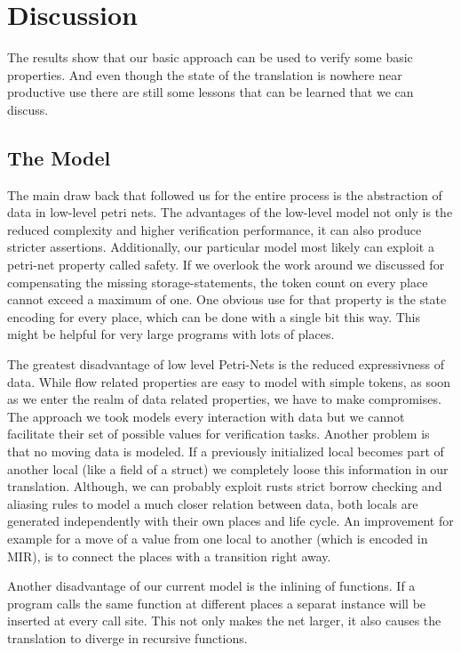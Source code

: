 \section{Discussion}
The results show that our basic approach can be used to verify some basic properties.
And even though the state of the translation is nowhere near productive use there are still some lessons that can be learned that we can discuss.
\subsection{The Model}
The main draw back that followed us for the entire process is the abstraction of data in low-level petri nets.
The advantages of the low-level model not only is the reduced complexity and higher verification performance, it can also produce stricter assertions.
Additionally, our particular model most likely can exploit a petri-net property called safety.
If we overlook the work around we discussed for compensating the missing storage-statements, the token count on every place cannot exceed a maximum of one.
One obvious use for that property is the state encoding for every place, which can be done with a single bit this way.
This might be helpful for very large programs with lots of places.

The greatest disadvantage of low level Petri-Nets is the reduced expressivness of data.
While flow related properties are easy to model with simple tokens, as soon as we enter the realm of data related properties, we have to make compromises.
The approach we took models every interaction with data but we cannot facilitate their set of possible values for verification tasks.
Another problem is that no moving data is modeled.
If a previously initialized local becomes part of another local (like a field of a struct) we completely loose this information in our translation.
Although, we can probably exploit rusts strict borrow checking and aliasing rules to model a much closer relation between data,
both locals are generated independently with their own places and life cycle.
An improvement for example for a move of a value from one local to another (which is encoded in MIR), is to connect the places with a transition right away.

Another disadvantage of our current model is the inlining of functions.
If a program calls the same function at different places a separat instance will be inserted at every call site.
This not only makes the net larger, it also causes the translation to diverge in recursive functions.

